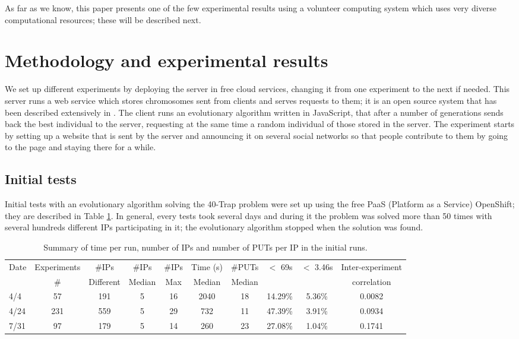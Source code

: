 \documentclass{sig-alternate}
\begin{document}
As far as we know, this paper presents one of the few experimental
results using a volunteer computing system which uses  %
very diverse computational resources; these will be described next.


\section{Methodology and experimental results}
\label{sec:exp1}


We set up different experiments by deploying the server in free cloud
services, changing it from one experiment to the next if needed. This server runs a web service
which stores chromosomes sent from clients and serves requests to
them; it is 
an open source system that has been described extensively in
\cite{2016arXiv160101607Manom}. The client runs an evolutionary
algorithm written in JavaScript, that after a number of generations
sends back the best individual to the server, requesting at the same
time a random individual of those stored in the server. The experiment
starts by setting up a website that is sent by the server and announcing it on several social
networks so that people contribute to them by going to the page and
staying there for a while. 

\subsection{Initial tests}

Initial tests with an evolutionary algorithm solving the 40-Trap
problem were set up using the free PaaS (Platform as a
Service) OpenShift; they are described in
Table \ref{tab:summary:os}. In general, every tests took several
days and during it the problem was solved more than 50 times with
several hundreds different IPs participating in it; the
evolutionary algorithm stopped when the solution was found. 
%
\begin{table}
\caption{Summary of time per run, number of IPs and number of PUTs per IP in the initial runs. \label{tab:summary:os}}
\begin{center}
\begin{tabular}{l|ccccccccc}
\hline
Date & Experiments &\#IPs &\#IPs &  \#IPs & Time (s) &  \#PUTs & $<$ 69s & $<$ 3.46s & Inter-experiment\\
     & \# & Different & Median & Max & Median &  Median & & & correlation \\ 
\hline
4/4 & 57 & 191 & 5 & 16 & 2040 & 18 & 14.29\% & 5.36\% & 0.0082 \\
4/24 & 231 & 559 & 5 & 29 & 732 & 11 & 47.39\% & 3.91\% & 0.0934\\
7/31 & 97 & 179 & 5 & 14 & 260 & 23 & 27.08\% & 1.04\%  & 0.1741\\
\hline
\end{tabular}
\end{center}
\end{table}
%
\end{document}
